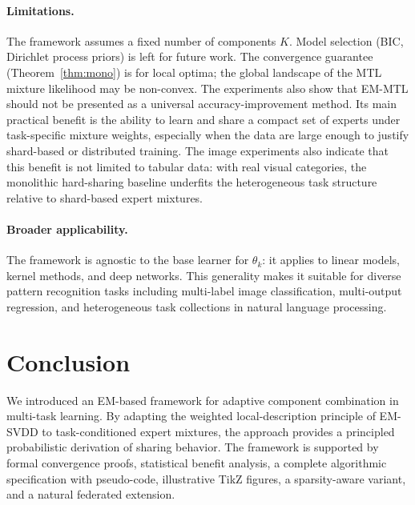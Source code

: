 \documentclass[preprint,12pt]{elsarticle}
\begin{document}
	\paragraph{Limitations.}
	The framework assumes a fixed number of components $K$. Model selection
	(BIC, Dirichlet process priors) is left for future work. The convergence
	guarantee (Theorem~\ref{thm:mono}) is for local optima; the global
	landscape of the MTL mixture likelihood may be non-convex. The
	experiments also show that EM-MTL should not be presented as a universal
	accuracy-improvement method. Its main practical benefit is the ability to
	learn and share a compact set of experts under task-specific mixture
	weights, especially when the data are large enough to justify shard-based
	or distributed training. The image experiments also indicate that this
	benefit is not limited to tabular data: with real visual categories,
	the monolithic hard-sharing baseline underfits the heterogeneous task
	structure relative to shard-based expert mixtures.
	
	\paragraph{Broader applicability.}
	The framework is agnostic to the base learner for $\theta_k$: it applies
	to linear models, kernel methods, and deep networks. This generality
	makes it suitable for diverse pattern recognition tasks including
	multi-label image classification, multi-output regression, and
	heterogeneous task collections in natural language processing.
	
	\section{Conclusion}
	\label{sec:conclusion}
	
	We introduced an EM-based framework for adaptive component combination
	in multi-task learning. By adapting the weighted local-description
	principle of EM-SVDD to task-conditioned expert mixtures, the approach
	provides a principled probabilistic derivation of sharing behavior.
	The framework is supported by formal convergence proofs, statistical
	benefit analysis, a complete algorithmic specification with pseudo-code,
	illustrative TikZ figures, a sparsity-aware variant, and a natural
	federated extension.
	
\end{document}
